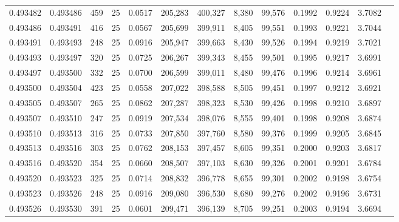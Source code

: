 \begin{tabular}{rrrrrrrrrrrrr}
0.493482 & 0.493486 &   459 &  25 &                                     0.0517 & 205,283 & 400,327 &   8,380 &  99,576 & 0.1992 & 0.9224 & 3.7082 \\
0.493486 & 0.493491 &   416 &  25 &                                     0.0567 & 205,699 & 399,911 &   8,405 &  99,551 & 0.1993 & 0.9221 & 3.7044 \\
0.493491 & 0.493493 &   248 &  25 &                                     0.0916 & 205,947 & 399,663 &   8,430 &  99,526 & 0.1994 & 0.9219 & 3.7021 \\
0.493493 & 0.493497 &   320 &  25 &                                     0.0725 & 206,267 & 399,343 &   8,455 &  99,501 & 0.1995 & 0.9217 & 3.6991 \\
0.493497 & 0.493500 &   332 &  25 &                                     0.0700 & 206,599 & 399,011 &   8,480 &  99,476 & 0.1996 & 0.9214 & 3.6961 \\
0.493500 & 0.493504 &   423 &  25 &                                     0.0558 & 207,022 & 398,588 &   8,505 &  99,451 & 0.1997 & 0.9212 & 3.6921 \\
0.493505 & 0.493507 &   265 &  25 &                                     0.0862 & 207,287 & 398,323 &   8,530 &  99,426 & 0.1998 & 0.9210 & 3.6897 \\
0.493507 & 0.493510 &   247 &  25 &                                     0.0919 & 207,534 & 398,076 &   8,555 &  99,401 & 0.1998 & 0.9208 & 3.6874 \\
0.493510 & 0.493513 &   316 &  25 &                                     0.0733 & 207,850 & 397,760 &   8,580 &  99,376 & 0.1999 & 0.9205 & 3.6845 \\
0.493513 & 0.493516 &   303 &  25 &                                     0.0762 & 208,153 & 397,457 &   8,605 &  99,351 & 0.2000 & 0.9203 & 3.6817 \\
0.493516 & 0.493520 &   354 &  25 &                                     0.0660 & 208,507 & 397,103 &   8,630 &  99,326 & 0.2001 & 0.9201 & 3.6784 \\
0.493520 & 0.493523 &   325 &  25 &                                     0.0714 & 208,832 & 396,778 &   8,655 &  99,301 & 0.2002 & 0.9198 & 3.6754 \\
0.493523 & 0.493526 &   248 &  25 &                                     0.0916 & 209,080 & 396,530 &   8,680 &  99,276 & 0.2002 & 0.9196 & 3.6731 \\
0.493526 & 0.493530 &   391 &  25 &                                     0.0601 & 209,471 & 396,139 &   8,705 &  99,251 & 0.2003 & 0.9194 & 3.6694 \\

\end{tabular}
